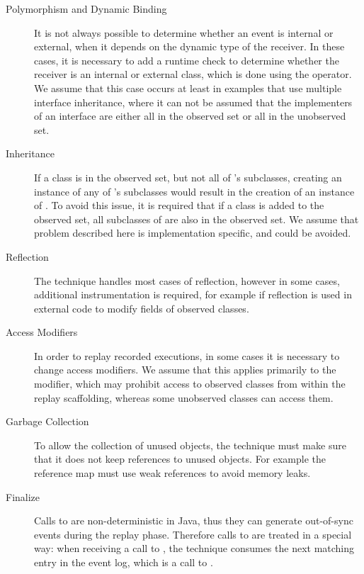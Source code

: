 \begin{description}
 \item [Polymorphism and Dynamic Binding] It is not always possible to determine whether an event is internal or external, when it depends on the dynamic type of the receiver. In these cases, it is necessary to add a runtime check to determine whether the receiver is an internal or external class, which is done using the  operator. We assume that this case occurs at least in examples that use multiple interface inheritance, where it can not be assumed that the implementers of an interface are either all in the observed set or all in the unobserved set.
 \item [Inheritance] If a class  is in the observed set, but not all of 's subclasses, creating an instance of any of 's subclasses would result in the creation of an instance of . To avoid this issue, it is required that if a class  is added to the observed set, all subclasses of  are also in the observed set. We assume that problem described here is implementation specific, and could be avoided.
 \item [Reflection] The technique handles most cases of reflection, however in some cases, additional instrumentation is required, for example if reflection is used in external code to modify fields of observed classes. 
 \item [Access Modifiers] In order to replay recorded executions, in some cases it is necessary to change access modifiers. We assume that this applies primarily to the  modifier, which may prohibit access to observed classes from within the replay scaffolding, whereas some unobserved classes can access them.
 \item [Garbage Collection] To allow the collection of unused objects, the technique must make sure that it does not keep references to unused objects. For example the reference map must use weak references to avoid memory leaks.
 \item [Finalize] Calls to  are non-deterministic in Java, thus they can generate out-of-sync events during the replay phase. Therefore calls to  are treated in a special way: when receiving a call to , the technique consumes the next matching entry in the event log, which is a call to .
\end{description}
